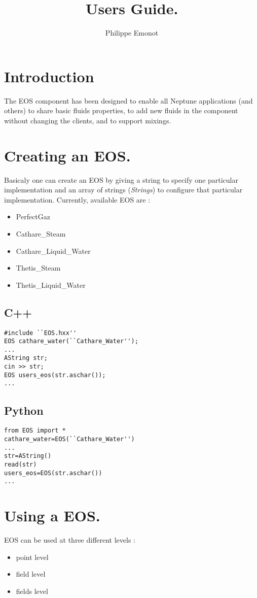 \documentclass[12pt]{article}
\title{Users Guide.}
\author{Philippe Emonot}
\begin{document}
\maketitle
\newpage
\tableofcontents
\newpage

\section{Introduction}
The EOS component has been designed to enable all Neptune applications (and others) to share basic fluids properties, to add new fluids in the component without changing the clients, and to support mixings.

\section{Creating an EOS.}
Basicaly one can create an EOS by giving a string to specify one particular implementation and an array of strings ({\em Strings}) to configure that particular implementation. Currently, available EOS are :
\begin{itemize}
\item PerfectGaz
\item Cathare\_Steam
\item Cathare\_Liquid\_Water
\item Thetis\_Steam
\item Thetis\_Liquid\_Water
\end{itemize}

\subsection{C++}
\begin{verbatim}
#include ``EOS.hxx''
EOS cathare_water(``Cathare_Water'');
...
AString str;
cin >> str;
EOS users_eos(str.aschar());
...
\end{verbatim}
\subsection{Python}
\begin{verbatim}
from EOS import *
cathare_water=EOS(``Cathare_Water'')
...
str=AString()
read(str)
users_eos=EOS(str.aschar())
...
\end{verbatim}
\section{Using a EOS.}
EOS can be used at three different levels :
\begin{itemize}
\item point level
\item field level
\item fields level
\end{itemize}
\end{document}
